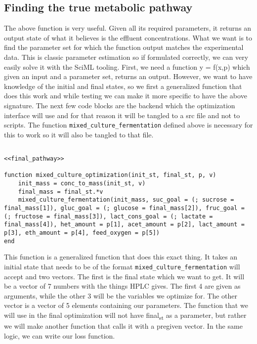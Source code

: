 \documentclass[11pt]{article}
\begin{document}
\subsection{Finding the true metabolic pathway}
\label{sec:orgeab7225}
The above function is very useful. Given all its required parameters, it returns an output state of what it believes is the effluent concentrations. What we want is to find the parameter set for which the function output matches the experimental data. This is classic parameter estimation so if formulated correctly, we can very easily solve it with the SciML tooling. First, we need a function y = f(x,p) which given an input and a parameter set, returns an output. However, we want to have knowledge of the initial and final states, so we first a generalized function that does this work and while testing we can make it more specific to have the above signature. The next few code blocks are the backend which the optimization interface will use and for that reason it will be tangled to a src file and not to scripts. The function \texttt{mixed\_culture\_fermentation} defined above is necessary for this to work so it will also be tangled to that file.

\begin{verbatim}

<<final_pathway>>

function mixed_culture_optimization(init_st, final_st, p, v)
    init_mass = conc_to_mass(init_st, v)
    final_mass = final_st.*v
    mixed_culture_fermentation(init_mass, suc_goal = (; sucrose = final_mass[1]), gluc_goal = (; glucose = final_mass[2]), fruc_goal = (; fructose = final_mass[3]), lact_cons_goal = (; lactate = final_mass[4]), het_amount = p[1], acet_amount = p[2], lact_amount = p[3], eth_amount = p[4], feed_oxygen = p[5])
end

\end{verbatim}

This function is a generalized function that does this exact thing. It takes an initial state that needs to be of the format \texttt{mixed\_culture\_fermentation} will accept and two vectors. The first is the final state which we want to get. It will be a vector of 7 numbers with the things HPLC gives. The first 4 are given as arguments, while the other 3 will be the variables we optimize for. The other vector is a vector of 5 elements containing our parameters. The function that we will use in the final optimization will not have final\textsubscript{st} as a parameter, but rather we will make another function that calls it with a pregiven vector. In the same logic, we can write our loss function.
\end{document}
